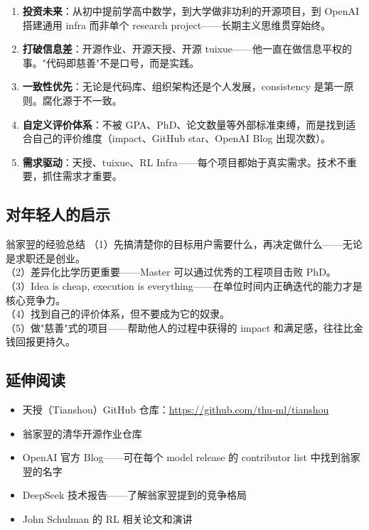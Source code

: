 \documentclass[a4paper]{article}
\begin{document}
\begin{enumerate}
    \item \textbf{投资未来}：从初中提前学高中数学，到大学做非功利的开源项目，到 OpenAI 搭建通用 infra 而非单个 research project——长期主义思维贯穿始终。

    \item \textbf{打破信息差}：开源作业、开源天授、开源 tuixue——他一直在做信息平权的事。"代码即慈善"不是口号，而是实践。

    \item \textbf{一致性优先}：无论是代码库、组织架构还是个人发展，consistency 是第一原则。腐化源于不一致。

    \item \textbf{自定义评价体系}：不被 GPA、PhD、论文数量等外部标准束缚，而是找到适合自己的评价维度（impact、GitHub star、OpenAI Blog 出现次数）。

    \item \textbf{需求驱动}：天授、tuixue、RL Infra——每个项目都始于真实需求。技术不重要，抓住需求才重要。
\end{enumerate}

\subsection{对年轻人的启示}

\begin{importantbox}{翁家翌的经验总结}
（1）先搞清楚你的目标用户需要什么，再决定做什么——无论是求职还是创业。\\
（2）差异化比学历更重要——Master 可以通过优秀的工程项目击败 PhD。\\
（3）Idea is cheap, execution is everything——在单位时间内正确迭代的能力才是核心竞争力。\\
（4）找到自己的评价体系，但不要成为它的奴隶。\\
（5）做"慈善"式的项目——帮助他人的过程中获得的 impact 和满足感，往往比金钱回报更持久。
\end{importantbox}

\subsection{延伸阅读}

\begin{itemize}
    \item 天授（Tianshou）GitHub 仓库：\url{https://github.com/thu-ml/tianshou}
    \item 翁家翌的清华开源作业仓库
    \item OpenAI 官方 Blog——可在每个 model release 的 contributor list 中找到翁家翌的名字
    \item DeepSeek 技术报告——了解翁家翌提到的竞争格局
    \item John Schulman 的 RL 相关论文和演讲
\end{itemize}

\end{document}
